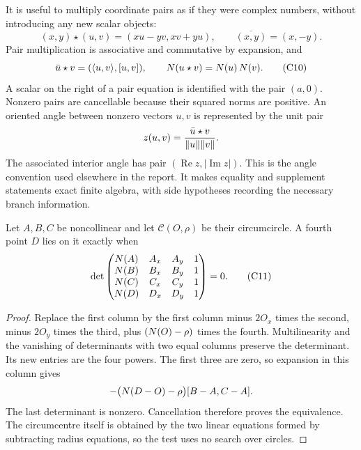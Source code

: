 It is useful to multiply coordinate pairs as if they were complex numbers,
without introducing any new scalar objects:
\[
 (x,y)\star(u,v)=(xu-yv,xv+yu),\qquad
 \overline{(x,y)}=(x,-y).
\]
Pair multiplication is associative and commutative by expansion, and
\[
 \bar u\star v=(\langle u,v\rangle,[u,v]),\qquad
 N(u\star v)=N(u)\,N(v).             \tag{C10}
\]
A scalar on the right of a pair equation is identified with the pair
$(a,0)$.  Nonzero pairs are cancellable because their squared norms are
positive.  An oriented angle between nonzero vectors $u,v$ is represented
by the unit pair
\[
 z(u,v)=\frac{\bar u\star v}{\lVert u\rVert\lVert v\rVert}.
\]
The associated interior angle has pair
$(\operatorname{Re}z,|\operatorname{Im}z|)$.
This is the angle convention used elsewhere in the report.  It makes
equality and supplement statements exact finite algebra, with side
hypotheses recording the necessary branch information.

\begin{theorem}
\label{circ:cyclic-determinant}
Let $A,B,C$ be noncollinear and let $\mathcal C(O,\rho)$ be their
circumcircle.  A fourth point $D$ lies on it exactly when
\[
 \det\begin{pmatrix}
 N(A)&A_x&A_y&1\\
 N(B)&B_x&B_y&1\\
 N(C)&C_x&C_y&1\\
 N(D)&D_x&D_y&1
 \end{pmatrix}=0.                                  \tag{C11}
\]
\end{theorem}
\begin{proof}
Replace the first column by the first column minus $2O_x$ times the
second, minus $2O_y$ times the third, plus
$(N(O)-\rho)$ times the fourth.  Multilinearity and the vanishing of
determinants with two equal columns preserve the determinant.  Its new
entries are the four powers.  The first three are zero, so expansion in
this column gives
\[
 -\bigl(N(D-O)-\rho\bigr)[B-A,C-A].
\]
The last determinant is nonzero.  Cancellation therefore proves the
equivalence.  The circumcentre itself is obtained by the two linear
equations formed by subtracting radius equations, so the test uses no
search over circles.
\end{proof}

